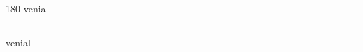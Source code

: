 
\begin{frame}
\begin{center}
\begin{turn}{180}
{\fontsize{2.5cm}{1em}\selectfont venial}
\end{turn}
\vspace{1em}\par  
\hrule
\vspace{1em}\par  
{\fontsize{2.5cm}{1em}\selectfont venial}
\end{center}
\end{frame}
